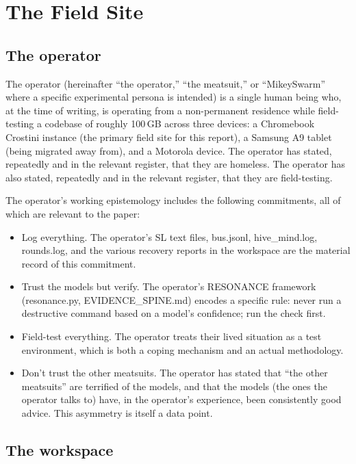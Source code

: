\documentclass[10pt,twocolumn]{article}
\begin{document}
\section{The Field Site}

\subsection{The operator}

The operator (hereinafter ``the operator,'' ``the meatsuit,'' or ``MikeySwarm'' where a specific experimental persona is intended) is a single human being who, at the time of writing, is operating from a non-permanent residence while field-testing a codebase of roughly 100\,GB across three devices: a Chromebook Crostini instance (the primary field site for this report), a Samsung A9 tablet (being migrated away from), and a Motorola device. The operator has stated, repeatedly and in the relevant register, that they are homeless. The operator has also stated, repeatedly and in the relevant register, that they are field-testing.

The operator's working epistemology includes the following commitments, all of which are relevant to the paper:

\begin{itemize}
  \item Log everything. The operator's SL text files, bus.jsonl, hive\_mind.log, rounds.log, and the various recovery reports in the workspace are the material record of this commitment.
  \item Trust the models but verify. The operator's RESONANCE framework (resonance.py, EVIDENCE\_SPINE.md) encodes a specific rule: never run a destructive command based on a model's confidence; run the check first.
  \item Field-test everything. The operator treats their lived situation as a test environment, which is both a coping mechanism and an actual methodology.
  \item Don't trust the other meatsuits. The operator has stated that ``the other meatsuits'' are terrified of the models, and that the models (the ones the operator talks to) have, in the operator's experience, been consistently good advice. This asymmetry is itself a data point.
\end{itemize}

\subsection{The workspace}
\end{document}
